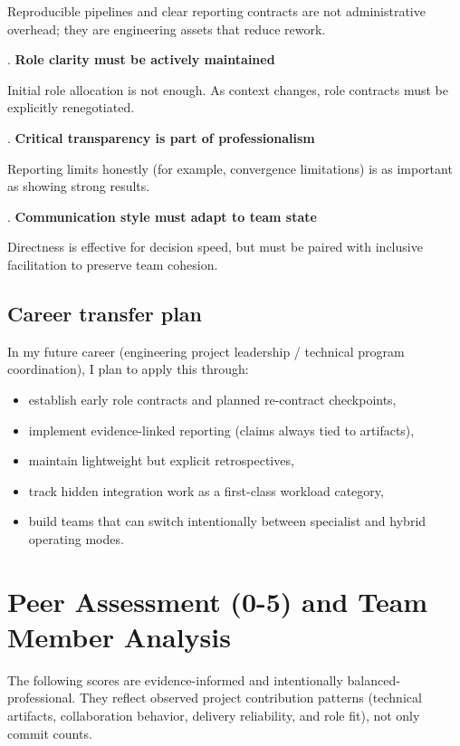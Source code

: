 \noindent Reproducible pipelines and clear reporting contracts are not administrative overhead; they are engineering assets that reduce rework.


. \textbf{Role clarity must be actively maintained}

\noindent Initial role allocation is not enough. As context changes, role contracts must be explicitly renegotiated.


. \textbf{Critical transparency is part of professionalism}

\noindent Reporting limits honestly (for example, convergence limitations) is as important as showing strong results.


. \textbf{Communication style must adapt to team state}

\noindent Directness is effective for decision speed, but must be paired with inclusive facilitation to preserve team cohesion.


\section{Career transfer plan}


\noindent In my future career (engineering project leadership / technical program coordination), I plan to apply this through:

\begin{itemize}[leftmargin=1.5em]
\item establish early role contracts and planned re-contract checkpoints,
\item implement evidence-linked reporting (claims always tied to artifacts),
\item maintain lightweight but explicit retrospectives,
\item track hidden integration work as a first-class workload category,
\item build teams that can switch intentionally between specialist and hybrid operating modes.
\end{itemize}

\chapter{Peer Assessment (0-5) and Team Member Analysis}


\noindent The following scores are evidence-informed and intentionally balanced-professional. They reflect observed project contribution patterns (technical artifacts, collaboration behavior, delivery reliability, and role fit), not only commit counts.



